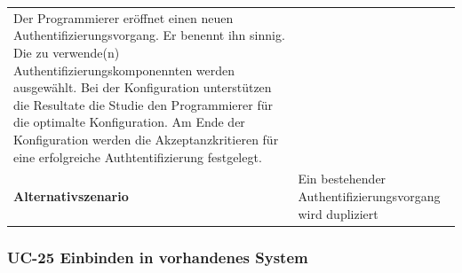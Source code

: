 \begin{longtable}[c]{@{}ll@{}}
\begin{minipage}[t]{0.60\columnwidth}\raggedright\strut
Der Programmierer eröffnet einen neuen Authentifizierungsvorgang. Er
benennt ihn sinnig. Die zu verwende(n) Authentifizierungskomponennten
werden ausgewählt. Bei der Konfiguration unterstützen die Resultate die
Studie den Programmierer für die optimalte Konfiguration. Am Ende der
Konfiguration werden die Akzeptanzkritieren für eine erfolgreiche
Authtentifizierung festgelegt.
\strut\end{minipage}\tabularnewline
\begin{minipage}[t]{0.34\columnwidth}\raggedright\strut
\textbf{Alternativszenario}
\strut\end{minipage} &
\begin{minipage}[t]{0.60\columnwidth}\raggedright\strut
Ein bestehender Authentifizierungsvorgang wird dupliziert
\strut\end{minipage}\tabularnewline
\bottomrule
\end{longtable}

\subsubsection{UC-25 Einbinden in vorhandenes
System}\label{uc-25-einbinden-in-vorhandenes-system}

